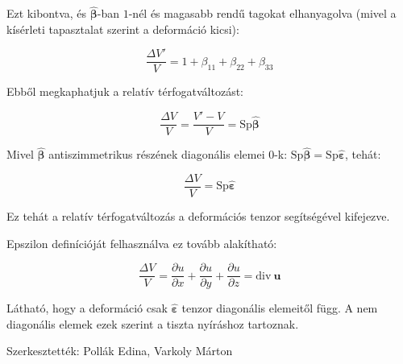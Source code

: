\documentclass[a4paper, 12pt]{article}
\begin{document}
Ezt kibontva, és $\mathbf{\hat\beta}$-ban $1$-nél és magasabb rendű tagokat elhanyagolva (mivel a kísérleti tapasztalat szerint a deformáció kicsi):

$$\frac{\Delta V'}{V}=1+\beta_{11}+\beta_{22}+\beta_{33}$$

Ebből megkaphatjuk a relatív térfogatváltozást:

$$\frac{\Delta V}{V}=\frac{V'-V}{V}=\mathrm{Sp} \mathbf{\hat\beta}$$

Mivel $\mathbf{\hat\beta}$ antiszimmetrikus részének diagonális elemei $0$-k: $\mathrm{Sp} \mathbf{\hat\beta}=\mathrm{Sp} \mathbf{\hat\varepsilon}$, tehát:

$$\frac{\Delta V}{V}=\mathrm{Sp} \mathbf{\hat\varepsilon}$$

Ez tehát a relatív térfogatváltozás a deformációs tenzor segítségével kifejezve.

Epszilon definícióját felhasználva ez tovább alakítható:

$$\frac{\Delta V}{V}=\frac{\partial u}{\partial x}+\frac{\partial u}{\partial y}+\frac{\partial u}{\partial z}=\mathrm{div}~\mathbf{u}$$

Látható, hogy a deformáció csak $\mathbf{\hat\varepsilon}$ tenzor diagonális elemeitől függ. A nem diagonális elemek ezek szerint a tiszta nyíráshoz tartoznak.

Szerkesztették: Pollák Edina, Varkoly Márton
\end{document}
